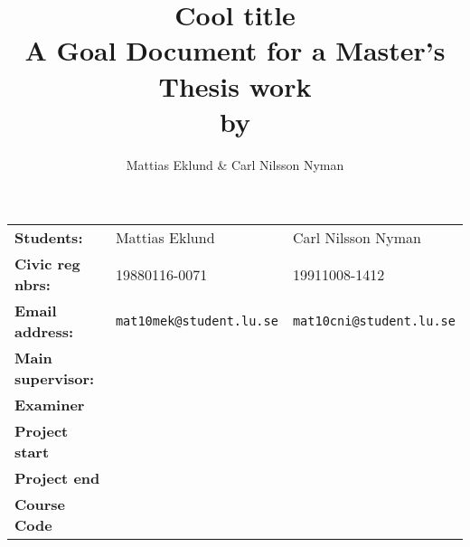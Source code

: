 \documentclass[a4paper]{article}
\title{Cool title\\\large{A Goal Document for a Master's Thesis work\\by}}
\author{Mattias Eklund \& Carl Nilsson Nyman}
\date{}
\begin{document}
\maketitle
\pagebreak

\begin{tabular}{lll}
	\textbf{Students:} & Mattias Eklund &Carl Nilsson Nyman \\
	\textbf{Civic reg nbrs:} & 19880116-0071& 19911008-1412\\
	\textbf{Email address:} & \texttt{mat10mek@student.lu.se}
	& \texttt{mat10cni@student.lu.se} \\
	\textbf{Main supervisor:} & & \\
	\textbf{Examiner} & & \\
	\textbf{Project start} & & \\
	\textbf{Project end} & & \\
	\textbf{Course Code} & & 
\end{tabular}

%
%
%
%
\end{document}
